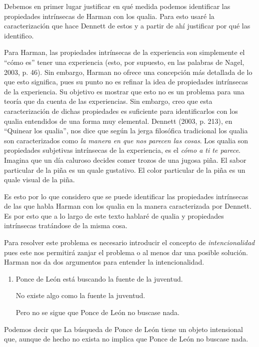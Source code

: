 \documentclass[]{book}
\begin{document}
\begin{refsection}
Debemos en primer lugar justificar en qué medida podemos identificar las
propiedades intrínsecas de Harman con los qualia. Para esto usaré la
caracterización que hace Dennett de estos y a partir de ahí justificar
por qué las identifico.

Para Harman, las propiedades intrínsecas de la experiencia son
simplemente el ``cómo es'' tener una experiencia (esto, por supuesto, en
las palabras de Nagel, 2003, p. 46). Sin embargo, Harman no ofrece una
concepción más detallada de lo que esto significa, pues su punto no es
refinar la idea de propiedades intrínsecas de la experiencia. Su
objetivo es mostrar que esto no es un problema para una teoría que da
cuenta de las experiencias. Sin embargo, creo que esta caracterización
de dichas propiedades es suficiente para identificarlos con los qualia
entendidos de una forma muy elemental. Dennett (2003, p. 213), en
``Quinear los qualia'', nos dice que según la jerga filosófica
tradicional los qualia son caracterizados como \emph{la manera en que
nos parecen las cosas}. Los qualia son propiedades subjetivas
intrínsecas de la experiencia, es el \emph{cómo a ti te parece}. Imagina
que un día caluroso decides comer trozos de una jugosa piña. El sabor
particular de la piña es un quale gustativo. El color particular de la
piña es un quale visual de la piña.

Es esto por lo que considero que se puede identificar las propiedades
intrínsecas de las que habla Harman con los qualia en la manera
caracterizada por Dennett. Es por esto que a lo largo de este texto
hablaré de qualia y propiedades intrínsecas tratándose de la misma cosa.

Para resolver este problema es necesario introducir el concepto de
\emph{intencionalidad} pues este nos permitirá zanjar el problema o al
menos dar una posible solución. Harman nos da dos argumentos para
entender la intencionalidad.

\begin{enumerate}
\def\labelenumi{\arabic{enumi}.}
\item
  Ponce de León está buscando la fuente de la juventud.

  No existe algo como la fuente la juventud.

  Pero no se sigue que Ponce de León no buscase nada.
\end{enumerate}

Podemos decir que La búsqueda de Ponce de León tiene un objeto
intensional que, aunque de hecho no exista no implica que Ponce de León
no buscase nada.


\end{refsection}
\end{document}
